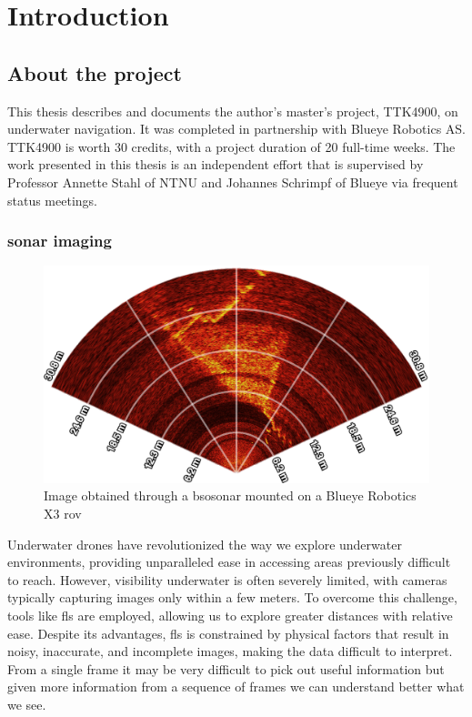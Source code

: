 \chapter{Introduction}
\label{chap:introduction}

\section{About the project}

This thesis describes and documents the author's master's project, TTK4900, on underwater navigation. It was completed in partnership with Blueye Robotics AS. TTK4900 is worth 30 credits, with a project duration of 20 full-time weeks. The work presented in this thesis is an independent effort that is supervised by Professor Annette Stahl of NTNU and Johannes Schrimpf of Blueye via frequent status meetings.

\subsection{\acrshort{sonar} imaging}

\begin{figure}[H]
  \centering
  \includegraphics[width=.7\textwidth]{figures/sonar_processed.png}
  \caption[\acrshort{fls} image from \acrshort{bsosonar}]{Image obtained through a \acrfull{bsosonar} mounted on a Blueye Robotics X3 \acrshort{rov}}
  \label{fig:sonarapp}
\end{figure}

Underwater drones have revolutionized the way we explore underwater environments, providing unparalleled ease in accessing areas previously difficult to reach. However, visibility underwater is often severely limited, with cameras typically capturing images only within a few meters. To overcome this challenge, tools like \acrfull{fls}  are employed, allowing us to explore greater distances with relative ease. Despite its advantages, \acrshort{fls} is constrained by physical factors that result in noisy, inaccurate, and incomplete images, making the data difficult to interpret. From a single frame it may be very difficult to pick out useful information but given more information from a sequence of frames we can understand better what we see.

